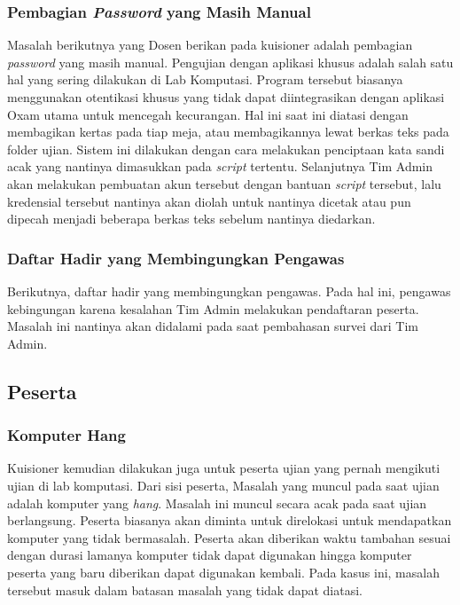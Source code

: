     \subsubsection{Pembagian \textit{Password} yang Masih
        Manual}\label{ref-prob-dosen-password} Masalah berikutnya yang Dosen
        berikan pada kuisioner adalah pembagian \textit{password} yang masih
        manual. Pengujian dengan aplikasi khusus adalah salah satu hal yang
        sering dilakukan di Lab Komputasi. Program tersebut biasanya menggunakan
        otentikasi khusus yang tidak dapat diintegrasikan dengan aplikasi Oxam
        utama untuk mencegah kecurangan. Hal ini saat ini diatasi dengan
        membagikan kertas pada tiap meja, atau membagikannya lewat berkas teks
        pada folder ujian. Sistem ini dilakukan dengan cara melakukan penciptaan
        kata sandi acak yang nantinya dimasukkan pada \textit{script} tertentu.
        Selanjutnya Tim Admin akan melakukan pembuatan akun tersebut dengan
        bantuan \textit{script} tersebut, lalu kredensial tersebut nantinya akan
        diolah untuk nantinya dicetak atau pun dipecah menjadi beberapa berkas
        teks sebelum nantinya diedarkan.

    \subsubsection{Daftar Hadir yang Membingungkan
        Pengawas}\label{ref-prob-dosen-daftar-hadir} Berikutnya, daftar hadir
        yang membingungkan pengawas. Pada hal ini, pengawas kebingungan karena
        kesalahan Tim Admin melakukan pendaftaran peserta. Masalah ini nantinya
        akan didalami pada saat pembahasan survei dari Tim Admin.

\subsection{Peserta}
    \subsubsection{Komputer Hang}\label{ref-prob-peserta-kompu-hang} Kuisioner
    kemudian dilakukan juga untuk peserta ujian yang pernah mengikuti ujian di
    lab komputasi. Dari sisi peserta, Masalah yang muncul pada saat ujian adalah
    komputer yang \textit{hang}. Masalah ini muncul secara acak pada saat ujian
    berlangsung. Peserta biasanya akan diminta untuk direlokasi untuk
    mendapatkan komputer yang tidak bermasalah. Peserta akan diberikan waktu
    tambahan sesuai dengan durasi lamanya komputer tidak dapat digunakan hingga
    komputer peserta yang baru diberikan dapat digunakan kembali. Pada kasus
    ini, masalah tersebut masuk dalam batasan masalah yang tidak dapat diatasi.
    
